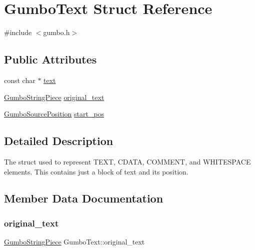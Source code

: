 \hypertarget{struct_gumbo_text}{}\section{Gumbo\+Text Struct Reference}
\label{struct_gumbo_text}


{\ttfamily \#include $<$gumbo.\+h$>$}

\subsection*{Public Attributes}
\begin{DoxyCompactItemize}
\item 
const char $\ast$ \mbox{\hyperlink{struct_gumbo_text_a6a992fb516fc59546a630714d1704747}{text}}
\item 
\mbox{\hyperlink{struct_gumbo_string_piece}{Gumbo\+String\+Piece}} \mbox{\hyperlink{struct_gumbo_text_a157500f4aec06fdc4977769116328b31}{original\+\_\+text}}
\item 
\mbox{\hyperlink{struct_gumbo_source_position}{Gumbo\+Source\+Position}} \mbox{\hyperlink{struct_gumbo_text_a7ed506026827c272bb36bd85a5321674}{start\+\_\+pos}}
\end{DoxyCompactItemize}


\subsection{Detailed Description}
The struct used to represent T\+E\+XT, C\+D\+A\+TA, C\+O\+M\+M\+E\+NT, and W\+H\+I\+T\+E\+S\+P\+A\+CE elements. This contains just a block of text and its position. 

\subsection{Member Data Documentation}
\mbox{\label{struct_gumbo_text_a157500f4aec06fdc4977769116328b31}} 
\subsubsection{\texorpdfstring{original\+\_\+text}{original\_text}}
{\footnotesize\ttfamily \mbox{\hyperlink{struct_gumbo_string_piece}{Gumbo\+String\+Piece}} Gumbo\+Text\+::original\+\_\+text}

